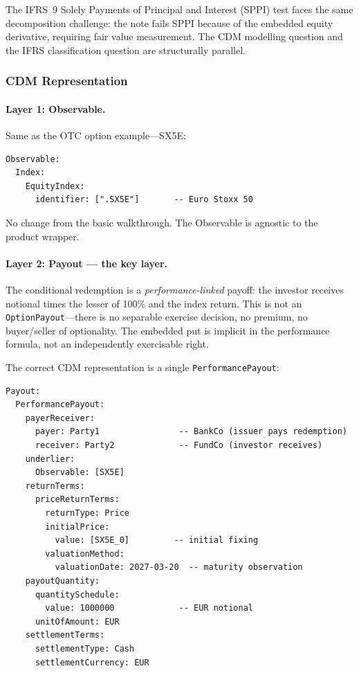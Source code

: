\documentclass[11pt,a4paper]{article}
\begin{document}
\noindent The IFRS~9 Solely Payments of Principal and Interest (SPPI) test faces the same decomposition challenge: the note fails SPPI because of the embedded equity derivative, requiring fair value measurement. The CDM modelling question and the IFRS classification question are structurally parallel.

\subsubsection{CDM Representation}
\label{sec:cdm-sn-representation}

\paragraph{Layer 1: Observable.} Same as the OTC option example---SX5E:

\begin{lstlisting}
Observable:
  Index:
    EquityIndex:
      identifier: [".SX5E"]       -- Euro Stoxx 50
\end{lstlisting}

\noindent No change from the basic walkthrough. The Observable is agnostic to the product wrapper.

\paragraph{Layer 2: Payout --- the key layer.}

The conditional redemption is a \emph{performance-linked} payoff: the investor receives notional times the lesser of 100\% and the index return. This is not an \texttt{OptionPayout}---there is no separable exercise decision, no premium, no buyer/seller of optionality. The embedded put is implicit in the performance formula, not an independently exercisable right.

The correct CDM representation is a single \texttt{PerformancePayout}:

\begin{lstlisting}
Payout:
  PerformancePayout:
    payerReceiver:
      payer: Party1                -- BankCo (issuer pays redemption)
      receiver: Party2             -- FundCo (investor receives)
    underlier:
      Observable: [SX5E]
    returnTerms:
      priceReturnTerms:
        returnType: Price
        initialPrice:
          value: [SX5E_0]         -- initial fixing
        valuationMethod:
          valuationDate: 2027-03-20  -- maturity observation
    payoutQuantity:
      quantitySchedule:
        value: 1000000             -- EUR notional
      unitOfAmount: EUR
    settlementTerms:
      settlementType: Cash
      settlementCurrency: EUR
\end{lstlisting}
\end{document}
